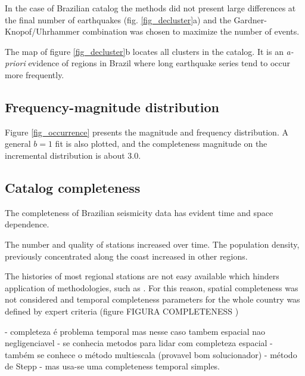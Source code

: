 \documentclass[draft, grl]{agutex}
\begin{document}
\begin{article}
In the case of Brazilian catalog the methods did not present large differences at the final number of earthquakes (fig. \ref{fig_decluster}a) and the Gardner-Knopof/Uhrhammer combination was chosen to maximize the number of events.

The map of figure \ref{fig_decluster}b locates all clusters in the catalog. It is an \emph{a-priori} evidence of regions in Brazil where long earthquake series tend to occur more frequently.




\subsection{Frequency-magnitude distribution}

Figure \ref{fig_occurrence} presents the magnitude and frequency distribution.
A general $b=1$ fit is also plotted, and the completeness magnitude on the incremental distribution is about 3.0.



\subsection{Catalog completeness}

The completeness of Brazilian seismicity data has evident time and space dependence.

The number and quality of stations increased over time. The population density, previously concentrated along the coast increased in other regions.


The histories of most regional stations are not easy available which hinders application of methodologies, such as \citet{mignan_2011}. For this reason, spatial completeness was not considered and temporal completeness parameters for the whole country was defined by expert criteria (figure FIGURA COMPLETENESS )



- completeza é problema temporal mas nesse caso tambem espacial nao negligenciavel
- se conhecia metodos para lidar com completeza espacial
- também se conhece o método multiescala (provavel bom solucionador)
- método de Stepp
- mas usa-se uma completeness temporal simples.


%
%

\end{article}
\end{document}
